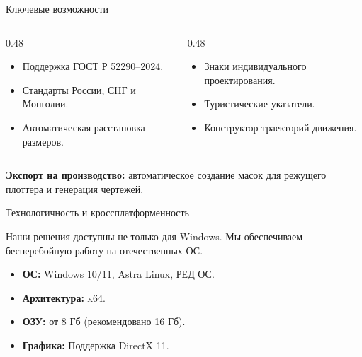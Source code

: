 \documentclass[aspectratio=169]{beamer}
\begin{document}
\begin{frame}{Ключевые возможности}
    \begin{columns}
        \begin{column}{0.48\textwidth}
            \begin{roundbox}
                \begin{itemize}
                    \item Поддержка \textcolor{AccentCyan}{ГОСТ Р 52290–2024}.
                    \item Стандарты России, СНГ и Монголии.
                    \item Автоматическая расстановка размеров.
                \end{itemize}
            \end{roundbox}
        \end{column}
        \begin{column}{0.48\textwidth}
            \begin{roundbox}[Индивидуальность]
                \begin{itemize}
                    \item Знаки \textcolor{AccentCyan}{индивидуального} проектирования.
                    \item Туристические указатели.
                    \item Конструктор траекторий движения.
                \end{itemize}
            \end{roundbox}
        \end{column}
    \end{columns}
    \vspace{0.5cm}
    \begin{simplebox}
        \centering
        \textcolor{TextHighlight}{\textbf{Экспорт на производство:}} автоматическое создание масок для режущего плоттера и генерация чертежей.
    \end{simplebox}
\end{frame}

\begin{frame}{Технологичность и кроссплатформенность}
    \begin{roundbox}
        Наши решения доступны не только для Windows. Мы обеспечиваем бесперебойную работу на отечественных ОС.
        \vspace{0.3cm}
        \begin{itemize}
            \item \textcolor{AccentCyan}{\textbf{ОС:}} Windows 10/11, \textcolor{TextHighlight}{Astra Linux}, РЕД ОС.
            \item \textcolor{AccentCyan}{\textbf{Архитектура:}} x64.
            \item \textcolor{AccentCyan}{\textbf{ОЗУ:}} от 8 Гб (рекомендовано 16 Гб).
            \item \textcolor{AccentCyan}{\textbf{Графика:}} Поддержка DirectX 11.
        \end{itemize}
    \end{roundbox}
\end{frame}
\end{document}
